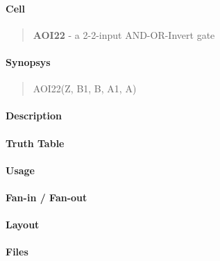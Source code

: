 \label{AOI22}
\paragraph{Cell}
\begin{quote}
    \textbf{AOI22} - a 2-2-input AND-OR-Invert gate
\end{quote}

\paragraph{Synopsys}
\begin{quote}
    AOI22(Z, B1, B, A1, A)
\end{quote}

\paragraph{Description}

%

\paragraph{Truth Table}
%

\paragraph{Usage}

\paragraph{Fan-in / Fan-out}

\paragraph{Layout}

\paragraph{Files}
